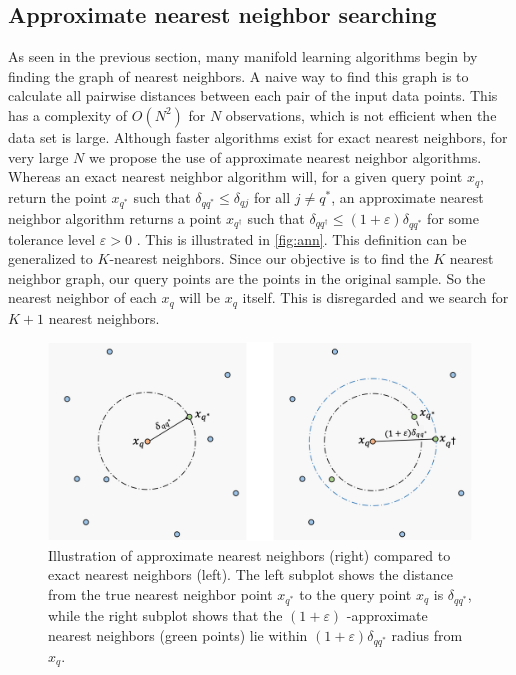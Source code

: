 \documentclass{article}
\begin{document}
\hypertarget{ann}{%
\subsection{Approximate nearest neighbor searching}\label{ann}}

As seen in the previous section, many manifold learning algorithms begin
by finding the graph of nearest neighbors. A naive way to find this
graph is to calculate all pairwise distances between each pair of the
input data points. This has a complexity of \(O(N^2)\) for \(N\)
observations, which is not efficient when the data set is large.
Although faster algorithms exist for exact nearest neighbors, for very
large \(N\) we propose the use of approximate nearest neighbor
algorithms. Whereas an exact nearest neighbor algorithm will, for a
given query point \(x_q\), return the point \(x_{q^*}\) such that
\(\delta_{q{q^*}} \leq \delta_{qj}\) for all \(j\neq q^*\), an
approximate nearest neighbor algorithm returns a point \(x_{q^\dagger}\)
such that \(\delta_{q{q^\dagger}} \leq (1+\varepsilon) \delta_{q{q^*}}\)
for some tolerance level \(\varepsilon > 0\) \citep{Arya1998-bv}. This
is illustrated in \autoref{fig:ann}. This definition can be generalized
to \(K\)-nearest neighbors. Since our objective is to find the \(K\)
nearest neighbor graph, our query points are the points in the original
sample. So the nearest neighbor of each \(x_q\) will be \(x_q\) itself.
This is disregarded and we search for \(K+1\) nearest neighbors.

\begin{figure}

{\centering \includegraphics[width=0.8\linewidth]{figures/ann} 

}

\caption{Illustration of approximate nearest neighbors (right) compared to exact nearest neighbors (left). The left subplot shows the distance from the true nearest neighbor point $x_{q^*}$ to the query point $x_q$ is $\delta_{q{q^*}}$, while the right subplot shows that the $(1+\varepsilon)$ -approximate nearest neighbors (green points) lie within $(1+\varepsilon) \delta_{q{q^*}}$ radius from $x_q$. }\label{fig:ann}
\end{figure}
\end{document}
